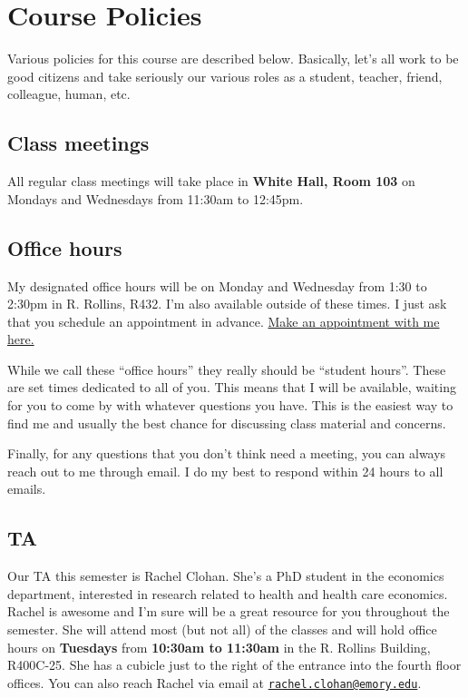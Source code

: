 \documentclass[11pt,]{article}
\begin{document}
\hypertarget{course-policies}{%
\section{Course Policies}\label{course-policies}}

Various policies for this course are described below. Basically, let's
all work to be good citizens and take seriously our various roles as a
student, teacher, friend, colleague, human, etc.

\hypertarget{class-meetings}{%
\subsection{Class meetings}\label{class-meetings}}

All regular class meetings will take place in \textbf{White Hall, Room
103} on Mondays and Wednesdays from 11:30am to 12:45pm.

\hypertarget{office-hours}{%
\subsection{Office hours}\label{office-hours}}

My designated office hours will be on Monday and Wednesday from 1:30 to
2:30pm in R. Rollins, R432. I'm also available outside of these times. I
just ask that you schedule an appointment in advance.
\href{https://mccarthy-meetings.youcanbook.me/}{Make an appointment with
me here.}

While we call these ``office hours'' they really should be ``student
hours''. These are set times dedicated to all of you. This means that I
will be available, waiting for you to come by with whatever questions
you have. This is the easiest way to find me and usually the best chance
for discussing class material and concerns.

Finally, for any questions that you don't think need a meeting, you can
always reach out to me through email. I do my best to respond within 24
hours to all emails.

\hypertarget{ta}{%
\subsection{TA}\label{ta}}

Our TA this semester is Rachel Clohan. She's a PhD student in the
economics department, interested in research related to health and
health care economics. Rachel is awesome and I'm sure will be a great
resource for you throughout the semester. She will attend most (but not
all) of the classes and will hold office hours on \textbf{Tuesdays} from
\textbf{10:30am to 11:30am} in the R. Rollins Building, R400C-25. She
has a cubicle just to the right of the entrance into the fourth floor
offices. You can also reach Rachel via email at
\href{mailto:rachel.clohan@emory.edu}{\nolinkurl{rachel.clohan@emory.edu}}.
\end{document}
